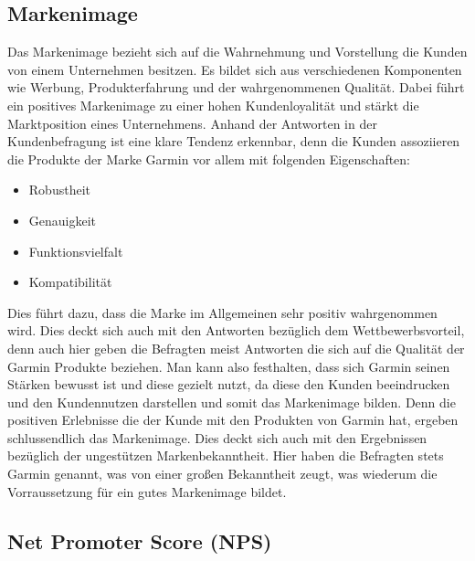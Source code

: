 \subsection{Markenimage}
Das Markenimage bezieht sich auf die Wahrnehmung und Vorstellung die Kunden von einem Unternehmen besitzen. Es bildet sich aus verschiedenen Komponenten wie Werbung, Produkterfahrung und der wahrgenommenen Qualität. Dabei führt ein positives Markenimage zu einer hohen Kundenloyalität und stärkt die Marktposition eines Unternehmens.\cite{Markenimage}  
Anhand der Antworten in der Kundenbefragung ist eine klare Tendenz erkennbar, denn die Kunden assoziieren die Produkte der Marke Garmin vor allem mit folgenden Eigenschaften:
\begin{itemize}
    \item Robustheit
    \item Genauigkeit
    \item Funktionsvielfalt
    \item Kompatibilität
\end{itemize} 
Dies führt dazu, dass die Marke im Allgemeinen sehr positiv wahrgenommen wird. Dies deckt sich auch mit den Antworten bezüglich dem Wettbewerbsvorteil, denn auch hier geben die Befragten meist Antworten die sich auf die Qualität der Garmin Produkte beziehen.
Man kann also festhalten, dass sich Garmin seinen Stärken bewusst ist und diese gezielt nutzt, da diese den Kunden beeindrucken und den Kundennutzen darstellen und somit das Markenimage bilden. Denn die positiven Erlebnisse die der Kunde mit den Produkten von Garmin hat, ergeben schlussendlich das Markenimage. Dies deckt sich auch mit den Ergebnissen bezüglich der ungestützen Markenbekanntheit. Hier haben die Befragten stets Garmin genannt, was von einer großen Bekanntheit zeugt, was wiederum die Vorraussetzung für ein gutes Markenimage bildet. 

\subsection{Net Promoter Score (NPS)}

